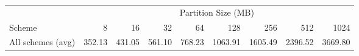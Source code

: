 \begin{tabular}{lrrrrrrrr}
\toprule
 & \multicolumn{8}{c}{Partition Size (MB)} \\
Scheme & 8 & 16 & 32 & 64 & 128 & 256 & 512 & 1024 \\
\midrule
All schemes (avg) & 352.13 & 431.05 & 561.10 & 768.23 & 1063.91 & 1605.49 & 2396.52 & 3669.80 \\
\bottomrule
\end{tabular}
